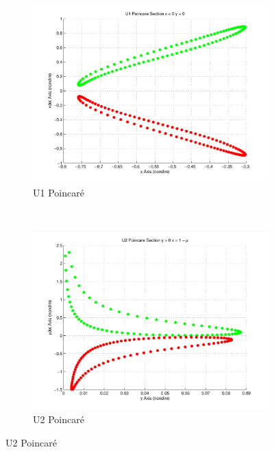 \begin{figure}
        	\centering
        	\begin{subfigure}[b]{0.5\textwidth}
                \includegraphics[width=\columnwidth]{figures/2015_SSPI/U1_poincare}
                \caption{U1 Poincar\'e}
                \label{fig:u1_poincare}
        	\end{subfigure}%
        	~%
        	\begin{subfigure}[b]{0.5\textwidth}
                \includegraphics[width=\columnwidth]{figures/2015_SSPI/U2_poincare}
                \caption{U2 Poincar\'e}
                \label{fig:u2_poincare}
        	\end{subfigure}
        	

\end{figure}
